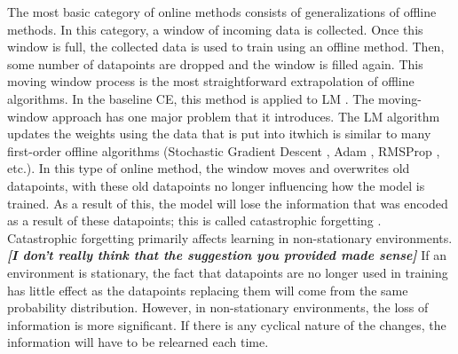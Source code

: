 	\par The most basic category of online methods consists of generalizations of offline methods. In this category, a window of incoming data is collected. Once this window is full, the collected data is used to train using an offline method. Then, some number of datapoints are dropped and the window is filled again. This moving window process is the most straightforward extrapolation of offline algorithms. In the baseline CE, this method is applied to LM \cite{placeholderCitation}. The moving-window approach has one major problem that it introduces. The LM algorithm updates the weights using the data that is put into itwhich is similar to many first-order offline algorithms (Stochastic Gradient Descent \cite{placeholderCitation}, Adam \cite{placeholderCitation}, RMSProp \cite{placeholderCitation}, etc.). In this type of online method, the window moves and overwrites old datapoints, with these old datapoints no longer influencing how the model is trained. As a result of this, the model will lose the information that was encoded as a result of these datapoints; this is called catastrophic forgetting \cite{placeholderCitation}.  Catastrophic forgetting primarily affects learning in non-stationary environments.\textbf{\textit{[I don't really think that the suggestion you provided made sense]}} If an environment is stationary, the fact that datapoints are no longer used in training has little effect as the datapoints replacing them will come from the same probability distribution. However, in non-stationary environments, the loss of information is more significant. If there is any cyclical nature of the changes, the information will have to be relearned each time.
